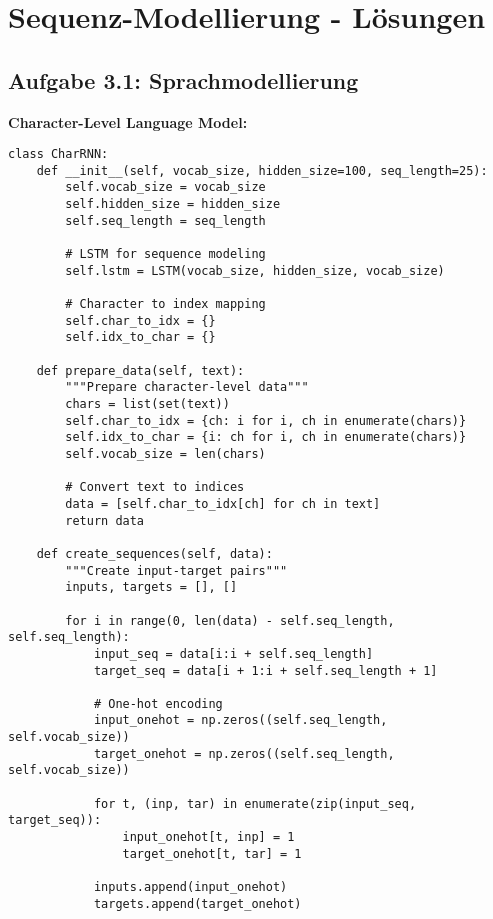 ﻿\documentclass[12pt,a4paper]{article}
\begin{document}
\section{Sequenz-Modellierung - Lösungen}

\subsection{Aufgabe 3.1: Sprachmodellierung}

\textbf{Character-Level Language Model:}

\begin{lstlisting}
class CharRNN:
    def __init__(self, vocab_size, hidden_size=100, seq_length=25):
        self.vocab_size = vocab_size
        self.hidden_size = hidden_size
        self.seq_length = seq_length
        
        # LSTM for sequence modeling
        self.lstm = LSTM(vocab_size, hidden_size, vocab_size)
        
        # Character to index mapping
        self.char_to_idx = {}
        self.idx_to_char = {}
    
    def prepare_data(self, text):
        """Prepare character-level data"""
        chars = list(set(text))
        self.char_to_idx = {ch: i for i, ch in enumerate(chars)}
        self.idx_to_char = {i: ch for i, ch in enumerate(chars)}
        self.vocab_size = len(chars)
        
        # Convert text to indices
        data = [self.char_to_idx[ch] for ch in text]
        return data
    
    def create_sequences(self, data):
        """Create input-target pairs"""
        inputs, targets = [], []
        
        for i in range(0, len(data) - self.seq_length, self.seq_length):
            input_seq = data[i:i + self.seq_length]
            target_seq = data[i + 1:i + self.seq_length + 1]
            
            # One-hot encoding
            input_onehot = np.zeros((self.seq_length, self.vocab_size))
            target_onehot = np.zeros((self.seq_length, self.vocab_size))
            
            for t, (inp, tar) in enumerate(zip(input_seq, target_seq)):
                input_onehot[t, inp] = 1
                target_onehot[t, tar] = 1
            
            inputs.append(input_onehot)
            targets.append(target_onehot)
        

\end{lstlisting}
\end{document}
